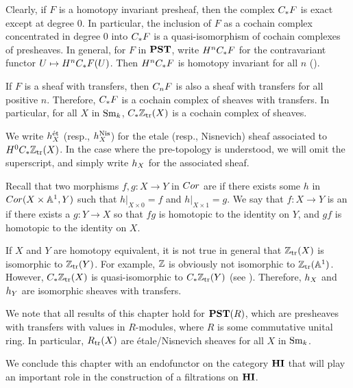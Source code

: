 Clearly, if $F$ is a homotopy invariant presheaf, then the complex 
$\suslC F$ is exact except at degree $0$. In particular, the
inclusion of $F$ as a cochain complex concentrated in degree $0$ into
$\suslC F$ is a quasi-isomorphism of cochain complexes of presheaves.
In general, for $F$ in $\PST$, write $H^n \suslC F$ for the 
contravariant functor $U \mapsto H^n \suslC F(U)$. Then $H^n \suslC F$
is homotopy invariant for all $n$ (\cite[2.19]{MVW}).

If $F$ is a sheaf with transfers, then $\suslC[n] F$ is also a sheaf
with transfers for all positive $n$. Therefore, $\suslC F$ is a
cochain complex of sheaves with transfers. In particular, for all
$X$ in $\Sm$, $\suslC \Ztr(X)$ is a cochain complex of sheaves.

\begin{defn}\label{def_hSX}
We write $\hS{X}^{\mathrm{\acute{e}t}}$ (resp., $\hS{X}^{\Nis}$) 
for the etale (resp., Nisnevich) sheaf associated to $H^0 \suslC 
\Ztr(X)$. In the case where the pre-topology is understood, we will
omit the superscript, and simply write $\hS{X}$ for the associated
sheaf.
\end{defn}

\begin{rmk}
Recall that two morphisms $f, g: X \to Y$ in $\Cor$ are 
 if there exists some $h$ in $\Cor(X \times 
\A^1, Y)$ such that $h|_{X \times 0} = f$ and $h|_{X \times 1} = 
g$. We say that $f: X \to Y$ is an  if there exists a $g: Y \to X$ so that $fg$ is 
homotopic to the identity on $Y$, and $gf$ is homotopic to the 
identity on $X$.

If $X$ and $Y$ are homotopy equivalent, it is not true in general 
that $\Ztr(X)$ is isomorphic to $\Ztr(Y)$. For example, $\Z$ is
obviously not isomorphic to $\Ztr(\A^1)$. However, $\suslC \Ztr(X)$
is quasi-isomorphic to $\suslC \Ztr(Y)$ (see \cite[2.26]{MVW}).
Therefore, $\hS{X}$ and $\hS{Y}$ are isomorphic sheaves with 
transfers.
\end{rmk}

\begin{rmk}
We note that all results of this chapter hold for $\PST(R)$, which
are presheaves with transfers with values in $R$-modules, where $R$
is some commutative unital ring. In particular, $\Rtr(X)$ are
\'etale/Nisnevich sheaves for all $X$ in $\Sm$.
\end{rmk}

We conclude this chapter with an endofunctor on the category $\HI$
that will play an important role in the construction of a 
filtrations on $\HI$.

